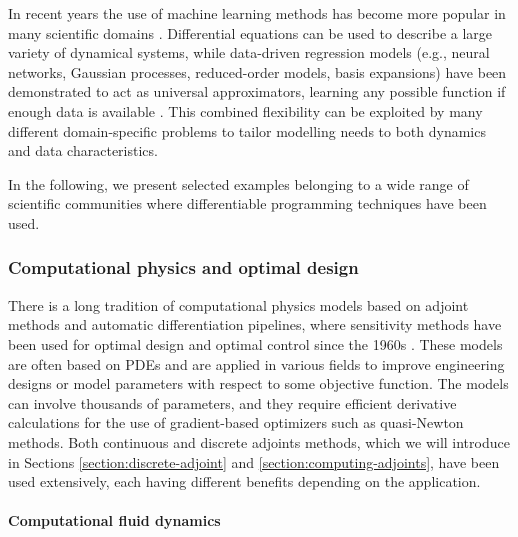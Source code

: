 In recent years the use of machine learning methods has become more popular in many scientific domains \cite{rasp2018,pichler2023, chem_ml_review, borowiec2022}. 
Differential equations can be used to describe a large variety of dynamical systems, while data-driven regression models (e.g., neural networks, Gaussian processes, reduced-order models, basis expansions) have been demonstrated to act as universal approximators, learning any possible function if enough data is available \cite{gorban_1998}. 
This combined flexibility can be exploited by many different domain-specific problems to tailor modelling needs to both dynamics and data characteristics.

In the following, we present selected examples belonging to a wide range of scientific communities where differentiable programming techniques have been used. 

\subsubsection{Computational physics and optimal design}

There is a long tradition of computational physics models based on adjoint methods and automatic differentiation pipelines, where sensitivity methods have been used for optimal design and optimal control since the 1960s \cite{lions1971optimal}. 
These models are often based on PDEs and are applied in various fields to improve engineering designs or model parameters with respect to some objective function. 
The models can involve thousands of parameters, and they require efficient derivative calculations for the use of gradient-based optimizers such as quasi-Newton methods. 
Both continuous and discrete adjoints methods, which we will introduce in Sections \ref{section:discrete-adjoint} and \ref{section:computing-adjoints}, have been used extensively, each having different benefits depending on the application.

\paragraph{Computational fluid dynamics}

